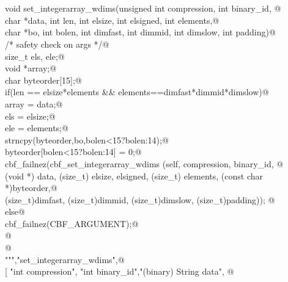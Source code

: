 \documentclass[10pt,a4paper,twoside,notitlepage]{article}
\begin{document}
\begin{flushleft}
\begin{minipage}{\linewidth}
\begin{list}{}{}
\mbox{}\verb@@\\
\mbox{}\verb@%apply (char *STRING, int LENGTH) { (char *data, int len) } set_integerarray_wdims;@\\
\mbox{}\verb@%apply (char *STRING, int LENGTH) { (char *bo, int bolen) } set_integerarray_wdims;@\\
\mbox{}\verb@@\\
\mbox{}\verb@    void set_integerarray_wdims(unsigned int compression, int binary_id, @\\
\mbox{}\verb@             char *data, int len, int elsize, int elsigned, int elements,@\\
\mbox{}\verb@             char *bo, int bolen, int dimfast, int dimmid, int dimslow, int padding){@\\
\mbox{}\verb@        /* safety check on args */@\\
\mbox{}\verb@        size_t els, ele;@\\
\mbox{}\verb@        void *array;@\\
\mbox{}\verb@        char byteorder[15];@\\
\mbox{}\verb@        if(len == elsize*elements && elements==dimfast*dimmid*dimslow){@\\
\mbox{}\verb@           array = data;@\\
\mbox{}\verb@           els = elsize;@\\
\mbox{}\verb@           ele = elements;@\\
\mbox{}\verb@           strncpy(byteorder,bo,bolen<15?bolen:14);@\\
\mbox{}\verb@           byteorder[bolen<15?bolen:14] = 0;@\\
\mbox{}\verb@           cbf_failnez(cbf_set_integerarray_wdims (self, compression, binary_id, @\\
\mbox{}\verb@           (void *) data,  (size_t) elsize, elsigned, (size_t) elements, (const char *)byteorder,@\\
\mbox{}\verb@           (size_t)dimfast, (size_t)dimmid, (size_t)dimslow, (size_t)padding)); @\\
\mbox{}\verb@        }else{@\\
\mbox{}\verb@           cbf_failnez(CBF_ARGUMENT);@\\
\mbox{}\verb@        }@\\
\mbox{}\verb@    }@\\
\mbox{}\verb@""","set_integerarray_wdims",@\\
\mbox{}\verb@[ "int compression", "int binary_id","(binary) String data", @\\

\end{list}
\end{minipage}
\end{flushleft}
\end{document}
